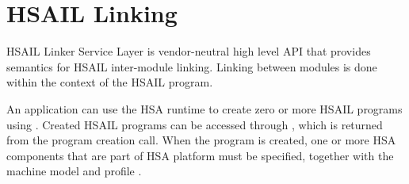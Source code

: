 \documentclass[final]{book}
\newcommand{\reffld}[1]{\textit{#1}}
\begin{document}






% 

\section{HSAIL Linking}\label{linking}

HSAIL Linker Service Layer is vendor-neutral high level API that provides
semantics for HSAIL inter-module linking. Linking between modules is done
within the context of the HSAIL program.

An application can use the HSA runtime to create zero or more HSAIL programs
using . Created HSAIL programs can be accessed through
, which is returned from the program creation call.
When the program is created, one or more HSA components  that
are part of HSA platform must be specified, together with the machine model
 and profile .
\end{document}
